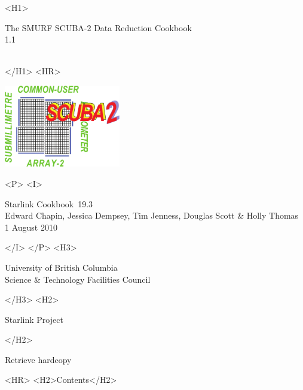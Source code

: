 \documentclass[twoside,11pt]{article}
\newcommand{\stardoccategory}  {Starlink Cookbook}
\newcommand{\stardocsource}    {sc\stardocnumber}
\newcommand{\stardocnumber}    {19.3}
\newcommand{\stardocauthors}   {Edward Chapin, Jessica Dempsey, Tim Jenness, Douglas Scott \& Holly Thomas}
\newcommand{\stardocdate}      {1 August 2010}
\newcommand{\stardoctitle}     {The SMURF SCUBA-2 Data Reduction Cookbook}
\newcommand{\stardocversion}   {1.1}
\newcommand{\stardocmanual}    {\ }
\newcommand{\htmladdnormallink}[2]{#1}
\newcommand{\htmladdimg}[1]{}
\newcommand{\htmlref}[2]{#1}
\newcommand{\htmladdtonavigation}[1]{}
\newcommand{\xlabel}[1]{}
\renewcommand{\_}{\texttt{\symbol{95}}}
\begin{document}
\begin{htmlonly}
   \xlabel{}
   \begin{rawhtml} <H1> \end{rawhtml}
      \stardoctitle\\
      \stardocversion\\
      \stardocmanual
   \begin{rawhtml} </H1> <HR> \end{rawhtml}

\includegraphics[width=2.0in]{sc19_logo}

   \begin{rawhtml} <P> <I> \end{rawhtml}
   \stardoccategory\ \stardocnumber \\
   \stardocauthors \\
   \stardocdate
   \begin{rawhtml} </I> </P> <H3> \end{rawhtml}
      \htmladdnormallink{University of British Columbia}
                        {http://www.ubc.ca} \\
      \htmladdnormallink{Science \& Technology Facilities Council}
                        {http://www.scitech.ac.uk} \\
   \begin{rawhtml} </H3> <H2> \end{rawhtml}
      \htmladdnormallink{Starlink Project}{http://www.starlink.ac.uk/}
   \begin{rawhtml} </H2> \end{rawhtml}
   \htmladdnormallink{\htmladdimg{source.gif} Retrieve hardcopy}
      {http://www.starlink.ac.uk/cgi-bin/hcserver?\stardocsource}\\

  \label{stardoccontents}
  \begin{rawhtml}
    <HR>
    <H2>Contents</H2>
  \end{rawhtml}
  \htmladdtonavigation{\htmlref{\htmladdimg{contents_motif.gif}}
        {stardoccontents}}


\end{htmlonly}
\end{document}

